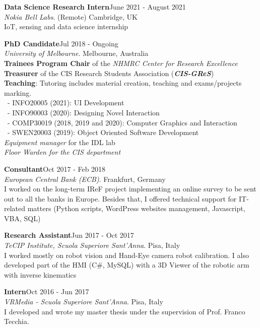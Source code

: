 \documentclass[margin]{res}
\begin{document}
\begin{resume}
\textbf{Data Science Research Intern}\hfill{June 2021 - August 2021}\\
\textit{Nokia Bell Labs}. (Remote) Cambridge, UK\\
IoT, sensing and data science internship

\textbf{PhD Candidate}\hfill{Jul 2018 - Ongoing}\\
\textit{University of Melbourne}. Melbourne, Australia\\
\textbullet{} \textbf{Trainees Program Chair} of the \textit{NHMRC Center for Research Excellence}\\
\textbullet{} \textbf{Treasurer} of the CIS Research Students Association (\textit{\textbf{CIS-GReS}})\\
\textbullet{} \textbf{Teaching}: Tutoring includes material creation, teaching and exams/projects marking.
\\\ - INFO20005 (2021): UI Development
\\\ - INFO90003 (2020): Designing Novel Interaction
\\\ - COMP30019 (2018, 2019 and 2020): Computer Graphics and Interaction
\\\ - SWEN20003 (2019): Object Oriented Software Development\\
\textbullet{} \textit{Equipment manager} for the IDL lab\\
\textbullet{} \textit{Floor Warden for the CIS department}

\textbf{Consultant}\hfill{Oct 2017 - Feb 2018}\\
 \textit{European Central Bank (ECB)}. Frankfurt, Germany\\
I worked on the long-term IReF project implementing an online survey to be sent out to all the banks in Europe. Besides that, I offered technical support for IT-related matters (Python scripts, WordPress websites management, Javascript, VBA, SQL)


\textbf{Research Assistant}\hfill{Jun 2017 - Oct 2017}\\
\textit{TeCIP Institute, Scuola Superiore Sant'Anna}. Pisa, Italy\\
I worked mostly on robot vision and Hand-Eye camera robot calibration. I also developed part of the HMI (C\#, MySQL) with a 3D Viewer of the robotic arm with inverse kinematics


\textbf{Intern}\hfill{Oct 2016 - Jun 2017}\\
\textit{VRMedia - Scuola Superiore Sant'Anna}. Pisa, Italy\\
I developed and wrote my master thesis under the supervision of Prof. Franco Tecchia.



\end{resume}
\end{document}
